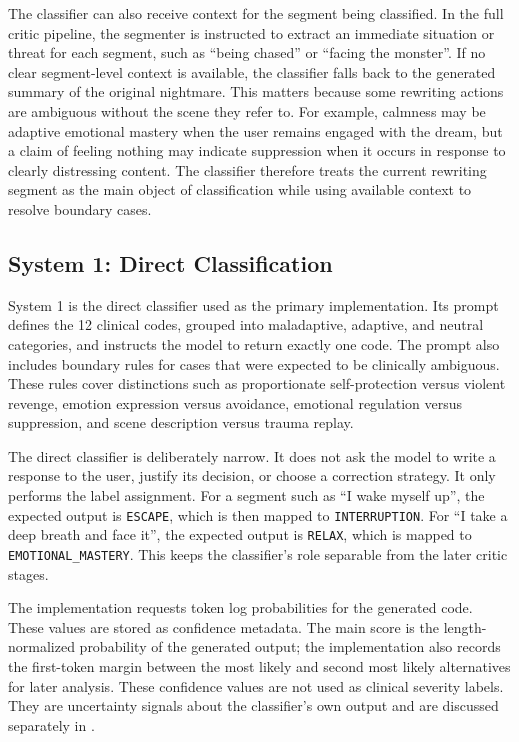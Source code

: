 The classifier can also receive context for the segment being classified. In the full critic pipeline, the segmenter is instructed to extract an immediate situation or threat for each segment, such as ``being chased'' or ``facing the monster''. If no clear segment-level context is available, the classifier falls back to the generated summary of the original nightmare. This matters because some rewriting actions are ambiguous without the scene they refer to. For example, calmness may be adaptive emotional mastery when the user remains engaged with the dream, but a claim of feeling nothing may indicate suppression when it occurs in response to clearly distressing content. The classifier therefore treats the current rewriting segment as the main object of classification while using available context to resolve boundary cases.

\subsection{System 1: Direct Classification}

System 1 is the direct classifier used as the primary implementation. Its prompt defines the 12 clinical codes, grouped into maladaptive, adaptive, and neutral categories, and instructs the model to return exactly one code. The prompt also includes boundary rules for cases that were expected to be clinically ambiguous. These rules cover distinctions such as proportionate self-protection versus violent revenge, emotion expression versus avoidance, emotional regulation versus suppression, and scene description versus trauma replay.

The direct classifier is deliberately narrow. It does not ask the model to write a response to the user, justify its decision, or choose a correction strategy. It only performs the label assignment. For a segment such as ``I wake myself up'', the expected output is \texttt{ESCAPE}, which is then mapped to \texttt{INTERRUPTION}. For ``I take a deep breath and face it'', the expected output is \texttt{RELAX}, which is mapped to \texttt{EMOTIONAL\_MASTERY}. This keeps the classifier's role separable from the later critic stages.

The implementation requests token log probabilities for the generated code. These values are stored as confidence metadata. The main score is the length-normalized probability of the generated output; the implementation also records the first-token margin between the most likely and second most likely alternatives for later analysis. These confidence values are not used as clinical severity labels. They are uncertainty signals about the classifier's own output and are discussed separately in .

